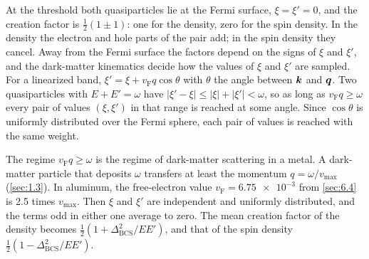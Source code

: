 At the threshold both quasiparticles lie at the Fermi surface, $\xi = \xi' = 0$, and the creation factor is $\frac12(1 \pm 1)$: one for the density, zero for the spin density. In the density the electron and hole parts of the pair add; in the spin density they cancel. Away from the Fermi surface the factors depend on the signs of $\xi$ and $\xi'$, and the dark-matter kinematics decide how the values of $\xi$ and $\xi'$ are sampled. For a linearized band, $\xi' = \xi + v_{\mathrm{F}}q\cos\theta$ with $\theta$ the angle between $\bm{k}$ and $\bm{q}$. Two quasiparticles with $E + E' = \omega$ have $|\xi'- \xi| \le |\xi| + |\xi'| < \omega$, so as long as $v_{\mathrm{F}}q \ge \omega$ every pair of values $(\xi, \xi')$ in that range is reached at some angle. Since $\cos\theta$ is uniformly distributed over the Fermi sphere, each pair of values is reached with the same weight.

The regime $v_{\mathrm{F}}q \ge \omega$ is the regime of dark-matter scattering in a metal. A dark-matter particle that deposits $\omega$ transfers at least the momentum $q = \omega/v_{\mathrm{max}}$ (\cref{sec:1.3}). In aluminum, the free-electron value $v_{\mathrm{F}} = \num{6.75e-3}$ from \cref{sec:6.4} is 2.5 times $v_{\mathrm{max}}$. Then $\xi$ and $\xi'$ are independent and uniformly distributed, and the terms odd in either one average to zero. The mean creation factor of the density becomes $\frac12(1 + \Delta_{\mathrm{BCS}}^2/EE')$, and that of the spin density $\frac12(1 - \Delta_{\mathrm{BCS}}^2/EE')$.

